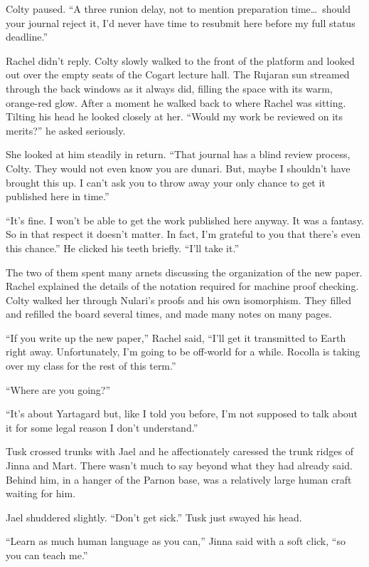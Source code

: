 Colty paused. ``A three runion delay, not to mention preparation time\ldots\ should your journal
reject it, I'd never have time to resubmit here before my full status deadline.''

Rachel didn't reply. Colty slowly walked to the front of the platform and looked out over the
empty seats of the Cogart lecture hall. The Rujaran sun streamed through the back windows as it
always did, filling the space with its warm, orange-red glow. After a moment he walked back to
where Rachel was sitting. Tilting his head he looked closely at her. ``Would my work be reviewed
on its merits?'' he asked seriously.

She looked at him steadily in return. ``That journal has a blind review process, Colty. They
would not even know you are dunari. But, maybe I shouldn't have brought this up. I can't ask you
to throw away your only chance to get it published here in time.''

``It's fine. I won't be able to get the work published here anyway. It was a fantasy. So in that
respect it doesn't matter. In fact, I'm grateful to you that there's even this chance.'' He
clicked his teeth briefly. ``I'll take it.''

The two of them spent many arnets discussing the organization of the new paper. Rachel explained
the details of the notation required for machine proof checking. Colty walked her through
Nulari's proofs and his own isomorphism. They filled and refilled the board several times, and
made many notes on many pages.

``If you write up the new paper,'' Rachel said, ``I'll get it transmitted to Earth right away.
Unfortunately, I'm going to be off-world for a while. Rocolla is taking over my class for the
rest of this term.''

``Where are you going?''

``It's about Yartagard but, like I told you before, I'm not supposed to talk about it for some
legal reason I don't understand.''

\spacebreak

Tusk crossed trunks with Jael and he affectionately caressed the trunk ridges of Jinna and Mart.
There wasn't much to say beyond what they had already said. Behind him, in a hanger of the
Parnon base, was a relatively large human craft waiting for him.

Jael shuddered slightly. ``Don't get sick.'' Tusk just swayed his head.

``Learn as much human language as you can,'' Jinna said with a soft click, ``so you can teach
me.''

